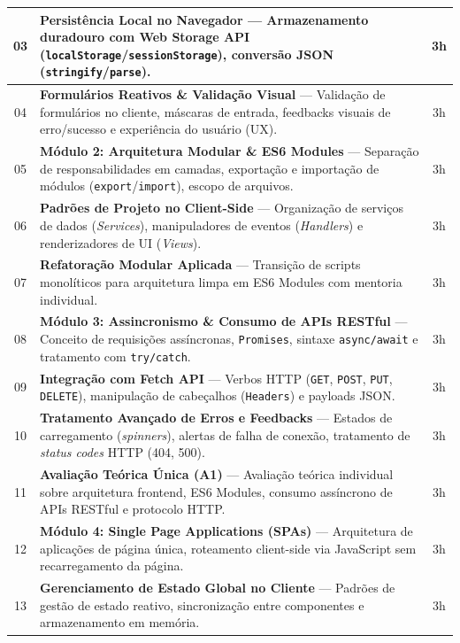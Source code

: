 \documentclass[12pt,a4paper]{article}
\begin{document}
\begin{table}[H]
\begin{tabularx}{\textwidth}{|c|X|c|}
\rowcolor{cinzaLinha}
03 & \textbf{Persistência Local no Navegador} — Armazenamento duradouro com Web Storage API (\texttt{localStorage}/\texttt{sessionStorage}), conversão JSON (\texttt{stringify}/\texttt{parse}). & 3h \\ \hline
04 & \textbf{Formulários Reativos \& Validação Visual} — Validação de formulários no cliente, máscaras de entrada, feedbacks visuais de erro/sucesso e experiência do usuário (UX). & 3h \\ \hline
\rowcolor{cinzaLinha}
05 & \textbf{Módulo 2: Arquitetura Modular \& ES6 Modules} — Separação de responsabilidades em camadas, exportação e importação de módulos (\texttt{export}/\texttt{import}), escopo de arquivos. & 3h \\ \hline
06 & \textbf{Padrões de Projeto no Client-Side} — Organização de serviços de dados (\textit{Services}), manipuladores de eventos (\textit{Handlers}) e renderizadores de UI (\textit{Views}). & 3h \\ \hline
\rowcolor{cinzaLinha}
07 & \textbf{Refatoração Modular Aplicada} — Transição de scripts monolíticos para arquitetura limpa em ES6 Modules com mentoria individual. & 3h \\ \hline
08 & \textbf{Módulo 3: Assincronismo \& Consumo de APIs RESTful} — Conceito de requisições assíncronas, \texttt{Promises}, sintaxe \texttt{async/await} e tratamento com \texttt{try/catch}. & 3h \\ \hline
\rowcolor{cinzaLinha}
09 & \textbf{Integração com Fetch API} — Verbos HTTP (\texttt{GET}, \texttt{POST}, \texttt{PUT}, \texttt{DELETE}), manipulação de cabeçalhos (\texttt{Headers}) e payloads JSON. & 3h \\ \hline
10 & \textbf{Tratamento Avançado de Erros e Feedbacks} — Estados de carregamento (\textit{spinners}), alertas de falha de conexão, tratamento de \textit{status codes} HTTP (404, 500). & 3h \\ \hline
\rowcolor{cinzaLinha}
11 & \textbf{Avaliação Teórica Única (A1)} — Avaliação teórica individual sobre arquitetura frontend, ES6 Modules, consumo assíncrono de APIs RESTful e protocolo HTTP. & 3h \\ \hline
12 & \textbf{Módulo 4: Single Page Applications (SPAs)} — Arquitetura de aplicações de página única, roteamento client-side via JavaScript sem recarregamento da página. & 3h \\ \hline
\rowcolor{cinzaLinha}
13 & \textbf{Gerenciamento de Estado Global no Cliente} — Padrões de gestão de estado reativo, sincronização entre componentes e armazenamento em memória. & 3h \\ \hline

\end{tabularx}
\end{table}
\end{document}

